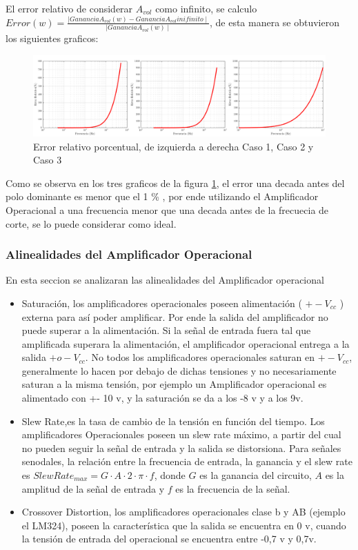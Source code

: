 \documentclass[../../main.tex]{subfiles}
\begin{document}
El error relativo de considerar $A_{vol}$  como infinito, se calculo $ Error(w) = \frac {\mid Ganancia A_{vol}(w) -Ganancia A_{vol} inifinito \mid} {\mid Ganancia A_{vol} (w) \mid }$, de esta manera se obtuvieron los siguientes graficos:

\begin{figure}[H]
\centering
\includegraphics[width=1\textwidth]{error_inv}
\caption{Error relativo porcentual, de izquierda a derecha Caso 1, Caso 2 y Caso 3} \label{fig=errorInv}
\end{figure}


Como se observa en los tres graficos de la figura \ref{fig=errorInv}, el error una decada antes del polo dominante es menor que el 1 \% , por ende utilizando el Amplificador Operacional a una frecuencia menor que una decada antes de la frecuecia de corte, se lo puede considerar como ideal.
\subsubsection{Alinealidades del Amplificador Operacional}
En esta seccion se analizaran las alinealidades del Amplificador operacional
\begin{itemize}  
\item Saturación, los amplificadores operacionales poseen alimentación ( $+-V_{cc}$ ) externa para así poder amplificar. Por ende la salida del amplificador no puede superar a la alimentación. Si la señal de entrada fuera tal que amplificada superara la alimentación, el amplificador operacional entrega a la salida $+ o -V_{cc}$. No todos los amplificadores operacionales saturan en $+-V_{cc}$, generalmente lo hacen por debajo de dichas tensiones y no necesariamente saturan a la misma tensión, por ejemplo un Amplificador operacional es alimentado con +- 10 v, y la saturación se da a los -8 v y a los 9v.
\item Slew Rate,es la tasa de cambio de la tensión en función del tiempo. Los amplificadores Operacionales poseen un slew rate máximo, a partir del cual no pueden seguir la señal de entrada y la salida se distorsiona. Para señales senodales, la relación entre la frecuencia de entrada, la ganancia y el slew rate es $ SlewRate_{max}=G \cdot A \cdot 2 \cdot \pi \cdot f $, donde $ G $ es la ganancia del circuito, $ A $ es la amplitud de la señal de entrada y $f$ es la frecuencia de la señal.
\item Crossover Distortion, los amplificadores operacionales clase b y AB (ejemplo el LM324), poseen la característica que la salida se encuentra en 0 v, cuando la tensión de entrada del operacional se encuentra entre -0,7 v y 0,7v.
\end{itemize}
\end{document}
